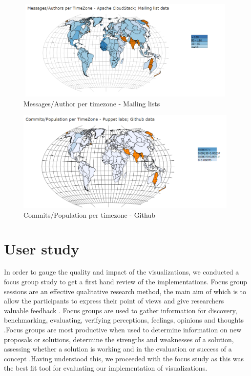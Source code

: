 \documentclass[double,12pt]{beavtex}
\begin{document}
\begin{figure}[!ht]
\centering
\includegraphics[width=110mm,height=50mm]{image9.PNG}
\caption{Messages/Author per timezone - Mailing lists}
\end{figure}

\begin{figure}[!ht]
\centering
\includegraphics[width=110mm,height=50mm]{image10.PNG}
\caption{Commits/Population per timezone - Github}
\end{figure}

\chapter{User study}
In order to gauge the quality and impact of the visualizations, we conducted a focus group study to get a first hand review of the implementations. Focus group sessions are an effective qualitative research method, the main aim of which is to allow the participants to express their point of views and give researchers valuable feedback \cite{villard}.  Focus groups are used to gather information for discovery, benchmarking, evaluating, verifying perceptions, feelings, opinions and thoughts \cite{patton1990}.Focus groups are most productive when used to determine information on new proposals or solutions, determine the strengths and weaknesses of a solution, assessing whether a solution is working and in the evaluation or success of a concept \cite{greenbaum1993}.Having understood this, we proceeded with the focus study as this was the best fit tool for evaluating our implementation of visualizations.
\end{document}
